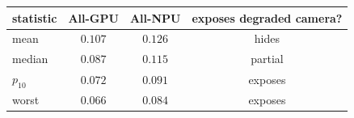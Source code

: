 \begin{tabular}{lccc}
\toprule
statistic & All-GPU & All-NPU & exposes degraded camera? \\
\midrule
mean     & $0.107$ & $0.126$ & hides \\
median   & $0.087$ & $0.115$ & partial \\
$p_{10}$ & $0.072$ & $0.091$ & exposes \\
worst    & $0.066$ & $0.084$ & exposes \\
\bottomrule
\end{tabular}
